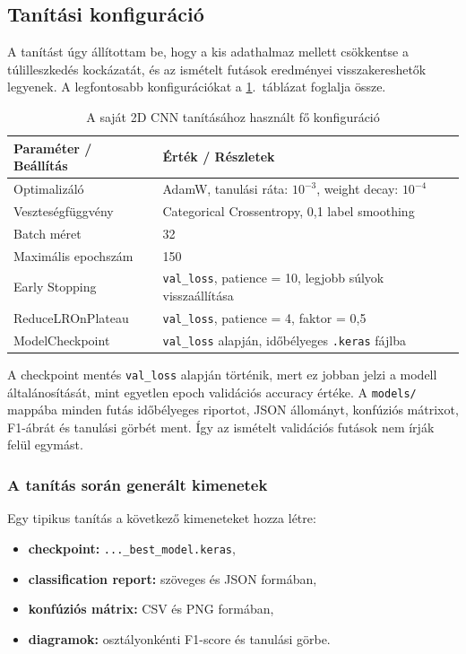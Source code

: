 \subsection{Tanítási konfiguráció}

A tanítást úgy állítottam be, hogy a kis adathalmaz mellett csökkentse a túlilleszkedés kockázatát, és az ismételt futások eredményei visszakereshetők legyenek. A legfontosabb konfigurációkat a \ref{tab:training_config}.~táblázat foglalja össze.

\begin{table}[H]
\centering
\caption{A saját 2D CNN tanításához használt fő konfiguráció}
\label{tab:training_config}
\begin{tabular}{lp{8.0cm}}
\toprule
\textbf{Paraméter / Beállítás} & \textbf{Érték / Részletek} \\
\midrule
Optimalizáló & AdamW, tanulási ráta: $10^{-3}$, weight decay: $10^{-4}$ \\
Veszteségfüggvény & Categorical Crossentropy, 0{,}1 label smoothing \\
Batch méret & 32 \\
Maximális epochszám & 150 \\
Early Stopping & \texttt{val\_loss}, patience = 10, legjobb súlyok visszaállítása \\
ReduceLROnPlateau & \texttt{val\_loss}, patience = 4, faktor = 0{,}5 \\
ModelCheckpoint & \texttt{val\_loss} alapján, időbélyeges \texttt{.keras} fájlba \\
\bottomrule
\end{tabular}
\end{table}

A checkpoint mentés \texttt{val\_loss} alapján történik, mert ez jobban jelzi a modell általánosítását, mint egyetlen epoch validációs accuracy értéke. A \texttt{models/} mappába minden futás időbélyeges riportot, JSON állományt, konfúziós mátrixot, F1-ábrát és tanulási görbét ment. Így az ismételt validációs futások nem írják felül egymást.

\subsubsection{A tanítás során generált kimenetek}
\label{subsubsec:model_outputs}

Egy tipikus tanítás a következő kimeneteket hozza létre:
\begin{itemize}
  \item \textbf{checkpoint:} \texttt{...\_best\_model.keras},
  \item \textbf{classification report:} szöveges és JSON formában,
  \item \textbf{konfúziós mátrix:} CSV és PNG formában,
  \item \textbf{diagramok:} osztályonkénti F1-score és tanulási görbe.
\end{itemize}

